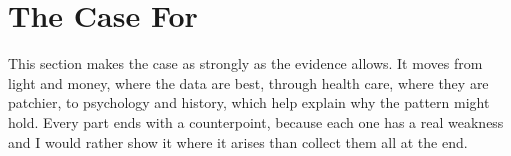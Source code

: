 \section{The Case For}
\label{sec:case-for}

This section makes the case as strongly as the evidence allows. It moves from
light and money, where the data are best, through health care, where they are
patchier, to psychology and history, which help explain why the pattern might
hold. Every part ends with a counterpoint, because each one has a real
weakness and I would rather show it where it arises than collect them all at
the end.






